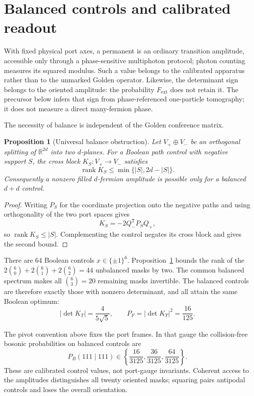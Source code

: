 \documentclass[11pt]{article}
\newtheorem{proposition}[theorem]{Proposition}
\theoremstyle{remark}
\begin{document}
\section{Balanced controls and calibrated readout}

With fixed physical port axes, a permanent is an ordinary transition amplitude,
accessible only through a phase-sensitive multiphoton protocol; photon
counting measures its squared modulus.  Such a value belongs to the calibrated
apparatus rather than to the unmarked Golden operator.  Likewise, the
determinant sign belongs to the oriented amplitude: the probability
\(F_{\mathrm{ext}}\) does not retain it.  The precursor below infers that sign
from phase-referenced one-particle tomography; it does not measure a direct
many-fermion phase.

The necessity of balance is independent of the Golden conference matrix.

\begin{proposition}[Universal balance obstruction]
\label{prop:balance-obstruction}
Let \(V_+\oplus V_-\) be an orthogonal splitting of
\(\mathbb R^{2d}\) into two \(d\)-planes.  For a Boolean path control with
negative support \(S\), the cross block \(K_S:V_+\to V_-\) satisfies
\[
 \operatorname{rank}K_S\leq\min\{|S|,2d-|S|\}.
\]
Consequently a nonzero filled \(d\)-fermion amplitude is possible only for a
balanced \(d+d\) control.
\end{proposition}

\begin{proof}
Writing \(P_S\) for the coordinate projection onto the negative paths and
using orthogonality of the two port spaces gives
\[
 K_S=-2Q_-^{\mathsf T}P_SQ_+,
\]
so \(\operatorname{rank}K_S\leq|S|\).  Complementing the control negates its
cross block and gives the second bound.
\end{proof}

There are \(64\) Boolean controls \(x\in\{\pm1\}^6\).
Proposition~\ref{prop:balance-obstruction} bounds the rank of the
\(2\binom60+2\binom61+2\binom62=44\) unbalanced masks by two.  The common
balanced spectrum makes all \(\binom63=20\) remaining masks invertible.
The balanced controls are therefore exactly those with nonzero determinant,
and all attain the same Boolean optimum:
\[
 |\det K_T|=\frac{4}{5\sqrt5},\qquad
 P_F=|\det K_T|^2=\frac{16}{125}.
\]

The pivot convention above fixes the port frames.  In that gauge the
collision-free bosonic probabilities on balanced controls are
\[
 P_B(111\mid111)\in
 \left\{\frac{16}{3125},\frac{36}{3125},\frac{64}{3125}\right\}.
\]
These are calibrated control values, not port-gauge invariants.  Coherent
access to the amplitudes distinguishes all twenty oriented masks; squaring
pairs antipodal controls and loses the overall orientation.
\end{document}
